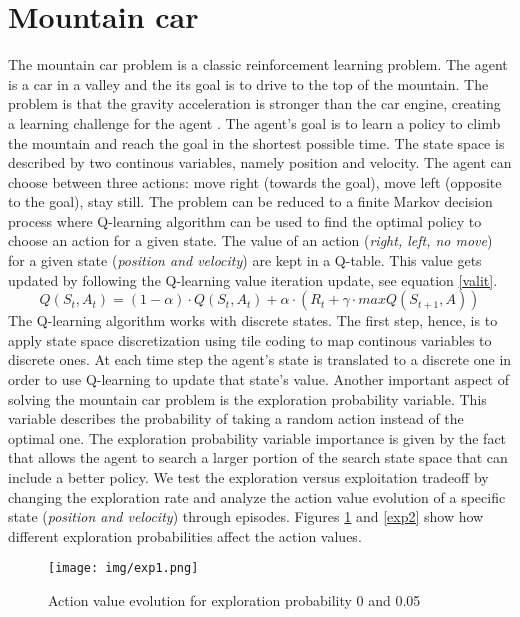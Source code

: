 \documentclass[runningheads]{llncs}
\begin{document}
\section{Mountain car}
The mountain car problem is a classic reinforcement learning
problem. The agent is a car in a valley and the its goal is to drive
to the top of the mountain. The problem is that the gravity
acceleration is stronger than the car engine, creating a learning
challenge for the agent \cite{rlbook}. The agent's goal is to learn
a policy to climb the mountain and reach the goal in the shortest
possible time. The state space is described by two continous
variables, namely position and velocity. The agent can choose between
three actions: move right (towards the goal), move left (opposite
to the goal), stay still. The problem can be reduced to a finite
Markov decision process where Q-learning algorithm can be used to
find the optimal policy to choose an action for a given state. The
value of an action (\textit{right, left, no move}) for a given state
(\textit{position and velocity}) are kept in a Q-table. This value gets
updated by following the Q-learning value iteration update, see equation \ref{valit}.
\begin{equation}\label{valit}
Q(S_t, A_t) = (1 - \alpha) \cdot Q(S_t, A_t) + \alpha \cdot (R_t + \gamma
\cdot maxQ(S_{t+1}, A)) 
\end{equation}
The Q-learning algorithm works with discrete states. The first step,
hence, is to apply state space discretization using tile coding to map
continous variables to discrete ones. At each time step the agent's
state is translated to a discrete one in order to use Q-learning to
update that state's value. Another important aspect of solving the
mountain car problem is the exploration probability variable. This
variable describes the probability of taking a random action instead of
the optimal one. The exploration probability variable importance is
given by the fact that allows the agent to search a larger portion of
the search state space that can include a better policy. We test the
exploration versus exploitation tradeoff by changing the
exploration rate and analyze the action value evolution of a specific state
(\textit{position and velocity}) through episodes. Figures \ref{exp1} and
\ref{exp2} show how different exploration probabilities affect the
action values. 
\begin{figure}
\texttt{[image: img/exp1.png]}
\caption{Action value evolution for exploration probability 0 and 0.05} \label{exp1}
\end{figure}
\end{document}
